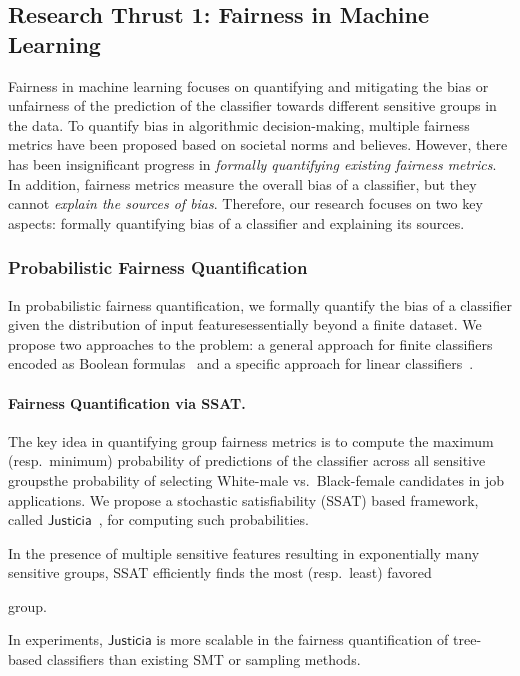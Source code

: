 \documentclass[10pt]{article}
\newif\iflongproposal
\begin{document}
	\subsection*{Research Thrust 1: Fairness in Machine Learning}
	
	Fairness in machine learning focuses on quantifying and mitigating the  bias or unfairness of the prediction of the classifier towards different sensitive groups in the data. To quantify bias in algorithmic decision-making, multiple fairness metrics have been proposed based on societal norms and believes. However, there has been insignificant progress in \textit{formally quantifying existing fairness metrics}. In addition, fairness metrics measure the overall bias of a classifier, but they cannot  \textit{explain the sources of bias}. Therefore, our research focuses on two key aspects: formally quantifying bias of a classifier and explaining its sources.
	
	\subsubsection*{Probabilistic Fairness Quantification} In probabilistic fairness quantification, we formally quantify the bias of a classifier given the distribution of input features\textemdash essentially beyond a finite dataset. We propose two approaches to the problem: a general approach for finite classifiers encoded as Boolean formulas~\cite{ghosh2021justicia} and a specific approach for linear classifiers~\cite{ghosh2022algorithmic}.
	

	
	
	\paragraph{Fairness Quantification via SSAT.} The key idea in quantifying group fairness metrics is to compute the maximum (resp.\ minimum) probability of predictions of the classifier across all sensitive groups\textemdash the probability of selecting White-male vs.\ Black-female candidates in job applications. We propose a stochastic satisfiability (SSAT) based framework, called $\mathsf{Justicia}$~\cite{ghosh2021justicia}, for computing such probabilities. 
	\iflongproposal
	More specifically, the maximum probability becomes the solution of an existential-random (ER)-SSAT formula\textemdash we encode the classifier as a Boolean formula, the feature distribution via random Boolean variables, and compute the maximum conditional probability of the satisfaction of the formula for existentially quantified sensitive features.
	\fi
	In the presence of multiple sensitive features resulting in exponentially many sensitive groups, SSAT efficiently finds the most (resp.\ least) favored
	\iflongproposal
	group by the classifier, thanks to the progress in satisfiability (SAT) solving, and particularly in weighted model counting problem.
	\else
	group.
	\fi 
	In experiments, $\mathsf{Justicia}$ is more scalable in the fairness quantification of tree-based classifiers than existing SMT or sampling methods.
	
\end{document}
